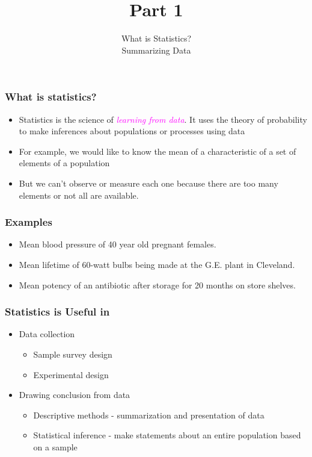 \documentclass[xcolor=dvipsnames,12pt]{beamer}
\title[]{Part 1}
\author[Stat 801]{What is Statistics?\\
Summarizing Data}
\date{}
\begin{document}
\begin{frame}[plain]
  \titlepage
\end{frame}





\begin{frame}
\frametitle{What is statistics?}
\begin{itemize}
\item Statistics is the science of  \textcolor{magenta}{\textit{learning from data}}. 
It uses the theory of probability to make inferences about populations
or processes using data
\item For example,  we would like to know the mean  of a 
characteristic of a set of elements of a population
\item But we can't 
observe or measure each one because there are too many elements
or not all are available.
\end{itemize}
\end{frame}


\begin{frame}
\frametitle{Examples}
\begin{itemize}
\item Mean blood pressure of 40 year old pregnant females.
\item Mean lifetime of 60-watt bulbs being made at the 
G.E. plant in Cleveland.
\item Mean potency of an antibiotic after storage for 20 months on 
store shelves.
\end{itemize}
\end{frame}

\begin{frame}
\frametitle{Statistics is Useful in}
\begin{itemize}
\item Data collection
\begin{itemize}
\item Sample survey design
\item Experimental design
\end{itemize}
\item Drawing conclusion from data
\begin{itemize}
\item Descriptive methods - summarization and presentation of data
\item Statistical inference - make statements about an entire population based on a sample
\end{itemize}
\end{itemize}
\end{frame}
\end{document}
